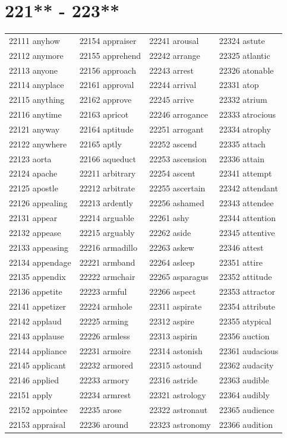 \documentclass[10pt, oneside]{book}
\begin{document}
\begin{table}
	\centering
	\section*{221** - 223**}
	\begin{tabular}{l l l l}
22111 anyhow &22154 appraiser &22241 arousal &22324 astute\\
22112 anymore &22155 apprehend &22242 arrange &22325 atlantic\\
22113 anyone &22156 approach &22243 arrest &22326 atonable\\
22114 anyplace &22161 approval &22244 arrival &22331 atop\\
22115 anything &22162 approve &22245 arrive &22332 atrium\\
22116 anytime &22163 apricot &22246 arrogance &22333 atrocious\\
22121 anyway &22164 aptitude &22251 arrogant &22334 atrophy\\
22122 anywhere &22165 aptly &22252 ascend &22335 attach\\
22123 aorta &22166 aqueduct &22253 ascension &22336 attain\\
22124 apache &22211 arbitrary &22254 ascent &22341 attempt\\
22125 apostle &22212 arbitrate &22255 ascertain &22342 attendant\\
22126 appealing &22213 ardently &22256 ashamed &22343 attendee\\
22131 appear &22214 arguable &22261 ashy &22344 attention\\
22132 appease &22215 arguably &22262 aside &22345 attentive\\
22133 appeasing &22216 armadillo &22263 askew &22346 attest\\
22134 appendage &22221 armband &22264 asleep &22351 attire\\
22135 appendix &22222 armchair &22265 asparagus &22352 attitude\\
22136 appetite &22223 armful &22266 aspect &22353 attractor\\
22141 appetizer &22224 armhole &22311 aspirate &22354 attribute\\
22142 applaud &22225 arming &22312 aspire &22355 atypical\\
22143 applause &22226 armless &22313 aspirin &22356 auction\\
22144 appliance &22231 armoire &22314 astonish &22361 audacious\\
22145 applicant &22232 armored &22315 astound &22362 audacity\\
22146 applied &22233 armory &22316 astride &22363 audible\\
22151 apply &22234 armrest &22321 astrology &22364 audibly\\
22152 appointee &22235 arose &22322 astronaut &22365 audience\\
22153 appraisal &22236 around &22323 astronomy &22366 audition\\
	\end{tabular}
 \end{table}
\clearpage
\end{document}
